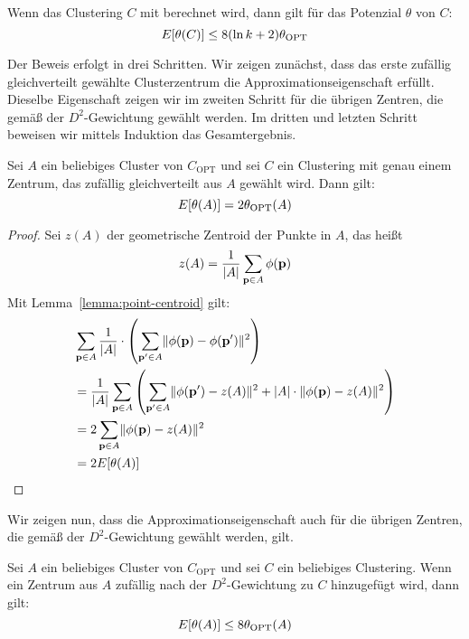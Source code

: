 \begin{satz}
\label{thm:kkmpp-ologk-approx}
	Wenn das Clustering $C$ mit \kkmpp{} berechnet wird, dann gilt für das Potenzial $\theta$ von $C$:
	\[ E[\theta(C)] \leq 8 (\ln{k} + 2) \theta_{\textrm{OPT}} \]
\end{satz}
Der Beweis erfolgt in drei Schritten. Wir zeigen zunächst, dass das erste zufällig gleichverteilt gewählte Clusterzentrum
die Approximationseigenschaft erfüllt. Dieselbe Eigenschaft zeigen wir im zweiten Schritt für die übrigen Zentren, die gemäß
der $D^2$-Gewichtung gewählt werden. Im dritten und letzten Schritt beweisen wir mittels Induktion das Gesamtergebnis.

\begin{lemma}
\label{lemma:kkmpp-first-center-approx}
	Sei $A$ ein beliebiges Cluster von $C_\textrm{OPT}$ und sei $C$ ein Clustering mit genau einem Zentrum, das zufällig
	gleichverteilt aus $A$ gewählt wird. Dann gilt:
	\[ E[\theta(A)] = 2 \theta_{\textrm{OPT}}(A) \]
\end{lemma}
\begin{proof}
	Sei $z(A)$ der geometrische Zentroid der Punkte in $A$, das heißt
	\[ z(A) = \frac{1}{\left|A\right|} \sum_{\mathbf{p} \in A} \phi(\mathbf{p}) \]
	Mit Lemma~\ref{lemma:point-centroid} gilt:
	\begin{align*}
		& \sum_{\mathbf{p} \in A} \frac{1}{\left|A\right|} \cdot \left( \sum_{\mathbf{p}' \in A} \lVert {\phi(\ensuremath{\mathbf{p}})} - {\phi(\mathbf{p}')} \rVert^2 \right) \\
		&= \frac{1}{\left|A\right|} \sum_{\mathbf{p} \in A} \left( \sum_{\mathbf{p}' \in A} \lVert {\phi(\ensuremath{\mathbf{p}}')} - {z(A)} \rVert^2 
			+ \left|A\right| \cdot \lVert {\phi(\ensuremath{\mathbf{p}})} - {z(A)} \rVert^2 \right) \\
		&= 2 \sum_{\mathbf{p} \in A} \lVert {\phi(\ensuremath{\mathbf{p}})} - {z(A)} \rVert^2 \\
		&= 2 E[\theta(A)]
	\end{align*}
\end{proof}
Wir zeigen nun, dass die Approximationseigenschaft auch für die übrigen Zentren, die gemäß der $D^2$-Gewichtung gewählt werden,
gilt.
\begin{lemma}
\label{lemma:kkmpp-remaining-center-approx}
	Sei $A$ ein beliebiges Cluster von $C_\textrm{OPT}$ und sei $C$ ein beliebiges Clustering. Wenn ein Zentrum aus $A$
	zufällig nach der $D^2$-Gewichtung zu $C$ hinzugefügt wird, dann gilt:
	\[ E[\theta(A)] \leq 8 \theta_{\textrm{OPT}}(A) \]
\end{lemma}
